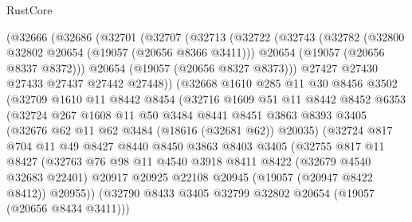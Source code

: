 \begin{lexlean}{RustCore}
\begin{coremodule}
        (@32666
          (@32686
            (@32701
              (@32707
                (@32713
                  (@32722
                    (@32743
                      (@32782
                        (@32800 @32802 @20654 (@19057 (@20656 @8366 @3411)))
                        @20654
                        (@19057 (@20656 @8337 @8372)))
                      @20654
                      (@19057 (@20656 @8327 @8373)))
                    @27427
                    @27430
                    @27433
                    @27437
                    @27442
                    @27448))
                (@32668
                  @1610
                  @285
                  @11
                  @30
                  @8456
                  @3502
                  (@32709
                    @1610
                    @11
                    @8442
                    @8454
                    (@32716
                      @1609
                      @51
                      @11
                      @8442
                      @8452
                      @6353
                      (@32724
                        @267
                        @1608
                        @11
                        @50
                        @3484
                        @8441
                        @8451
                        @3863
                        @8393
                        @3405
                        (@32676 @62 @11 @62 @3484 (@18616 (@32681 @62)) @20035)
                        (@32724
                          @817
                          @704
                          @11
                          @49
                          @8427
                          @8440
                          @8450
                          @3863
                          @8403
                          @3405
                          (@32755
                            @817
                            @11
                            @8427
                            (@32763
                              @76
                              @98
                              @11
                              @4540
                              @3918
                              @8411
                              @8422
                              (@32679 @4540 @32683 @22401)
                              @20917
                              @20925
                              @22108
                              @20945
                              (@19057 (@20947 @8422 @8412))
                              @20955))
                          (@32790 @8433 @3405 @32799 @32802 @20654 (@19057 (@20656 @8434 @3411)))

\end{coremodule}
\end{lexlean}
